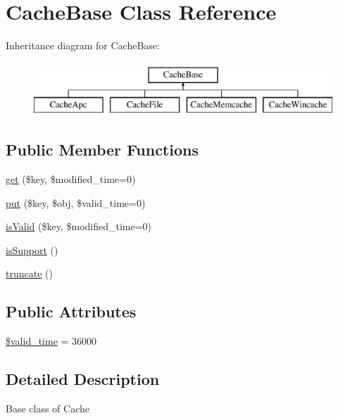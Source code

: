 \hypertarget{classCacheBase}{}\section{Cache\+Base Class Reference}
\label{classCacheBase}
Inheritance diagram for Cache\+Base\+:\begin{figure}[H]
\begin{center}
\leavevmode
\includegraphics[height=2.000000cm]{classCacheBase}
\end{center}
\end{figure}
\subsection*{Public Member Functions}
\begin{DoxyCompactItemize}
\item 
\hyperlink{classCacheBase_afee31dcb9d33e4e87c102d828c4d8d26}{get} (\$key, \$modified\+\_\+time=0)
\item 
\hyperlink{classCacheBase_aa6729e608bf81ffc19825f3f38777667}{put} (\$key, \$obj, \$valid\+\_\+time=0)
\item 
\hyperlink{classCacheBase_a9a8227b929be86601f4570f787c22746}{is\+Valid} (\$key, \$modified\+\_\+time=0)
\item 
\hyperlink{classCacheBase_a302d6640565e56c4f8b927fcf605f62b}{is\+Support} ()
\item 
\hyperlink{classCacheBase_ad4ef9d60ea844036b17364b6e30bcb39}{truncate} ()
\end{DoxyCompactItemize}
\subsection*{Public Attributes}
\begin{DoxyCompactItemize}
\item 
\hyperlink{classCacheBase_ad4f01a1a34bce91cb38308028252b233}{\$valid\+\_\+time} = 36000
\end{DoxyCompactItemize}


\subsection{Detailed Description}
Base class of Cache

